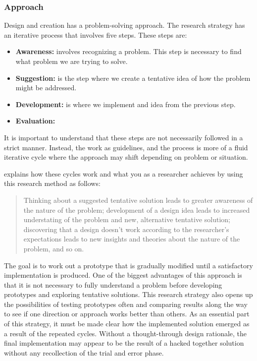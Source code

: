 \subsubsection{Approach}
\label{methodology-design-and-creation-approach}
Design and creation has a problem-solving approach. The research strategy has an iterative process that involves five steps. These steps are:

\begin{itemize}
    \item \textbf{Awareness:} involves recognizing a problem. This step is necessary to find what problem we are trying to solve.
    \item \textbf{Suggestion:} is the step where we create a tentative idea of how the problem might be addressed.
    \item \textbf{Development:} is where we implement and idea from the previous step.
    \item \textbf{Evaluation:} 
\end{itemize}

It is important to understand that these steps are not necessarily followed in a strict manner. Instead, the work as guidelines, and the process is more of a fluid iterative cycle where the approach may shift depending on problem or situation.

\cite{reseach-boka} explains how these cycles work and what you as a researcher achieves by using this research method as follows:

\begin{quote}
    Thinking about a suggested tentative solution leads to greater awareness of the nature of the problem; development of a design idea leads to increased understating of the problem and new, alternative tentative solution; discovering that a design doesn't work according to the researcher's expectations leads to new insights and theories about the nature of the problem, and so on. 
\end{quote}

The goal is to work out a prototype that is gradually modified until a satisfactory implementation is produced. One of the biggest advantages of this approach is that it is not necessary to fully understand a problem before developing prototypes and exploring tentative solutions. This research strategy also opens up the possibilities of testing prototypes often and comparing results along the way to see if one direction or approach works better than others. As an essential part of this strategy, it must be made clear how the implemented solution emerged as a result of the repeated cycles. Without a thought-through design rationale, the final implementation may appear to be the result of a hacked together solution without any recollection of the trial and error phase.

